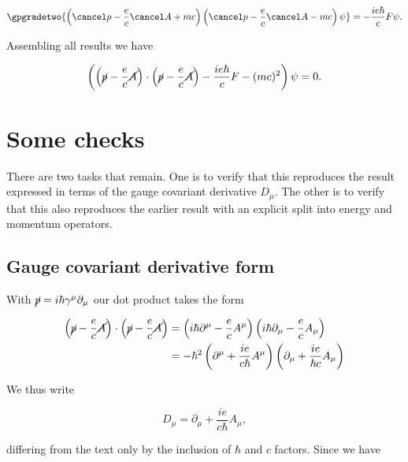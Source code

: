 \begin{equation}\label{eqn:diracCovariant:300}
\gpgradetwo{
\left(\pslash - \frac{e}{c}\Aslash + m c \right) \left(\pslash - \frac{e}{c}\Aslash - m c \right) \psi
}
=
-\frac{ie \hbar }{c } F \psi.
\end{equation}

Assembling all results we have

\begin{equation}\label{eqn:diracCovariant:320}
\left(
\left(\cancel{p} - \frac{e}{c}\cancel{A} \right) \cdot \left(\cancel{p} - \frac{e}{c}\cancel{A} \right) 
- \frac{ie \hbar }{c } F 
- (m c)^2 \right)  \psi = 0.
\end{equation}

\section{Some checks}

There are two tasks that remain.  One is to verify that this reproduces the result expressed in terms of the gauge covariant derivative $D_\mu$.  The other is to verify that this also reproduces the earlier result with an explicit split into energy and momentum operators.

\subsection{Gauge covariant derivative form}

With $\cancel{p} = i \hbar \gamma^\mu \partial_\mu$ our dot product takes the form

\begin{align*}
\left(\cancel{p} - \frac{e}{c}\cancel{A} \right) \cdot \left(\cancel{p} - \frac{e}{c}\cancel{A} \right) 
&=
\left(i \hbar \partial^\mu - \frac{e}{c}A^\mu \right) \left(i \hbar \partial_\mu - \frac{e}{c}A_\mu \right)  \\
&=
-\hbar^2 \left(\partial^\mu + \frac{i e}{c \hbar}A^\mu \right) \left(\partial_\mu + \frac{i e}{ \hbar c}A_\mu \right)  \\
\end{align*}

We thus write 

\begin{equation}\label{eqn:diracCovariant:340}
D_\mu = \partial_\mu + \frac{i e}{c \hbar}A_\mu,
\end{equation}

differing from the text only by the inclusion of $\hbar$ and $c$ factors.  Since we have


